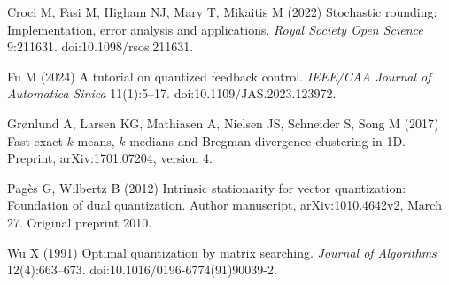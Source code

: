 Croci M, Fasi M, Higham NJ, Mary T, Mikaitis M (2022) Stochastic rounding: Implementation, error analysis and applications. \emph{Royal Society Open Science} 9:211631. doi:10.1098/rsos.211631.

Fu M (2024) A tutorial on quantized feedback control. \emph{IEEE/CAA Journal of Automatica Sinica} 11(1):5--17. doi:10.1109/JAS.2023.123972.

Gr{\o}nlund A, Larsen KG, Mathiasen A, Nielsen JS, Schneider S, Song M (2017) Fast exact $k$-means, $k$-medians and Bregman divergence clustering in 1D. Preprint, arXiv:1701.07204, version 4.

Pag\`es G, Wilbertz B (2012) Intrinsic stationarity for vector quantization: Foundation of dual quantization. Author manuscript, arXiv:1010.4642v2, March 27. Original preprint 2010.

Wu X (1991) Optimal quantization by matrix searching. \emph{Journal of Algorithms} 12(4):663--673. doi:10.1016/0196-6774(91)90039-2.
